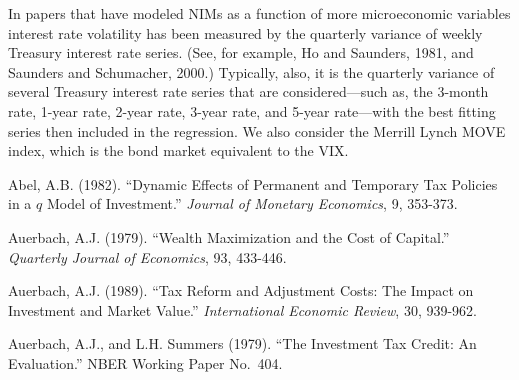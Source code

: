 \documentclass[11pt]{article}
\begin{document}
In papers that have modeled NIMs as a function of more microeconomic variables interest rate volatility has been measured by
the quarterly variance of weekly Treasury interest rate series. (See, for example, Ho and Saunders, 1981, and Saunders
and Schumacher, 2000.)  Typically, also, it is the quarterly variance of several Treasury interest rate series that are
considered---such as, the 3-month rate, 1-year rate, 2-year rate, 3-year rate, and 5-year rate---with the best fitting series then
included in the regression.  We also consider the Merrill Lynch MOVE index, which is the bond market equivalent to the VIX.



\newpage
\begin{thebibliography}{99}
\vspace{-0.1in}
 Abel, A.B. (1982).  ``Dynamic Effects of Permanent and Temporary Tax Policies in
a $q$ Model of Investment.''  \textit{Journal of Monetary Economics}, 9, 353-373.

 Auerbach, A.J. (1979). ``Wealth Maximization and the Cost of Capital.''
\textit{Quarterly Journal of Economics}, 93, 433-446.

 Auerbach, A.J. (1989). ``Tax Reform and Adjustment Costs:  The Impact on
Investment and Market Value.''  \textit{International Economic Review}, 30, 939-962.

 Auerbach, A.J., and L.H. Summers (1979). ``The Investment Tax Credit: An Evaluation.''
NBER Working Paper No.~404.

\end{thebibliography}
\end{document}
